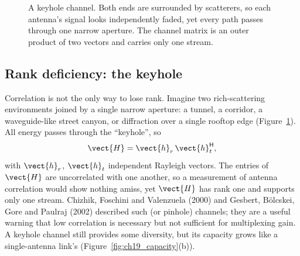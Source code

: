 \begin{figure}[htbp]\centering
{}
\caption{A keyhole channel. Both ends are surrounded by scatterers, so each antenna's signal
looks independently faded, yet every path passes through one narrow aperture. The channel matrix
is an outer product of two vectors and carries only one stream.}
\label{fig:ch19_keyhole}
\end{figure}

\subsection{Rank deficiency: the keyhole}

Correlation is not the only way to lose rank. Imagine two rich-scattering environments joined by a
single narrow aperture: a tunnel, a corridor, a waveguide-like street canyon, or diffraction over a
single rooftop edge (Figure~\ref{fig:ch19_keyhole}). All energy passes through the ``keyhole'', so
\begin{equation}
\vect{H}=\vect{h}_r\,\vect{h}_t^{\mathsf H},
\end{equation}
with $\vect{h}_r$, $\vect{h}_t$ independent Rayleigh vectors. The entries of $\vect{H}$ are
uncorrelated with one another, so a measurement of antenna correlation would show nothing amiss,
yet $\vect{H}$ has rank one and supports only one stream. Chizhik, Foschini and Valenzuela (2000)
and Gesbert, B\"olcskei, Gore and Paulraj (2002) described such  (or pinhole) channels;
they are a useful warning that low correlation is necessary but not sufficient for multiplexing gain.
A keyhole channel still provides some diversity, but its capacity grows like a single-antenna link's
(Figure~\ref{fig:ch19_capacity}(b)).

